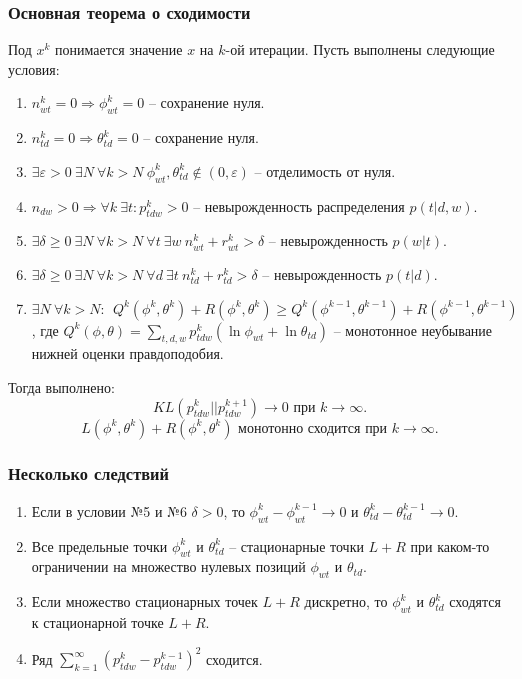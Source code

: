 \documentclass[utf8]{beamer}
\begin{document}
	\begin{frame}
		\frametitle{Основная теорема о сходимости}
\footnotesize{
Под $x^k$ понимается значение $x$ на $k$-ой итерации. Пусть выполнены следующие условия:
\begin{enumerate}
\item  $ n^k_{wt} = 0 \Rightarrow \phi^k_{wt} = 0$ -- сохранение нуля.
\item $n^k_{td} = 0 \Rightarrow \theta^k_{td} = 0$ -- сохранение нуля.
\item $\exists \varepsilon>0\ \exists N\ \forall k > N\ \phi^k_{wt}, \theta^k_{td} \notin (0, \varepsilon)$ -- отделимость от нуля.
\item  $ n_{dw}>0 \Rightarrow \forall k\ \exists t\colon p^k_{tdw} > 0$ -- невырожденность распределения $ p(t|d,w)$.
\item $\exists \delta\geq 0\ \exists N\ \forall k > N \ \forall t\ \exists w\  n^k_{wt} + r^k_{wt} > \delta$ -- невырожденность $p(w|t)$.
\item $\exists \delta\geq 0\ \exists N\ \forall k > N \ \forall d\ \exists t\  n^k_{td} + r^k_{td} > \delta$ -- невырожденность $p(t|d)$.
\item $\exists N\ \forall k > N\colon\ \ Q^k (\phi^k, \theta^k)+ R(\phi^k, \theta^k) \geq Q^k(\phi^{k-1}, \theta^{k-1}) + R(\phi^{k-1}, \theta^{k-1})$, где $Q^k(\phi, \theta) = \sum\limits_{t,d,w} p^k_{tdw} (\ln \phi_{wt} + \ln \theta_{td})$ --  монотонное неубывание нижней оценки правдоподобия.
\end{enumerate}
Тогда выполнено:
\[
KL(p_{tdw}^{k}||p_{tdw}^{k + 1}) \to 0 \text{ при } k \to \infty.
\]
\[
L(\phi^k, \theta^k) + R(\phi^k, \theta^k) \text{ монотонно сходится при } k \to \infty.
\]
}
	\end{frame}

	\begin{frame}
		\frametitle{Несколько следствий}
\begin{enumerate}
\item  Если в условии №5 и №6 $\delta > 0$, то $\phi^k_{wt} - \phi_{wt}^{k-1} \to 0$ и $\theta^k_{td} - \theta^{k-1}_{td} \to 0$.
\item Все предельные точки $\phi^k_{wt}$ и $\theta^k_{td}$ -- стационарные точки $L + R$ при каком-то ограничении на множество нулевых позиций $\phi_{wt}$ и $\theta_{td}$.
\item Если множество стационарных точек $L + R$ дискретно, то $\phi_{wt}^k$ и $\theta_{td}^k$ сходятся к стационарной точке $L+R$.
\item Ряд $\sum\limits_{k=1}^{\infty} (p_{tdw}^k - p_{tdw}^{k-1})^2$ сходится.
\end{enumerate}
	\end{frame}
	
\end{document}
